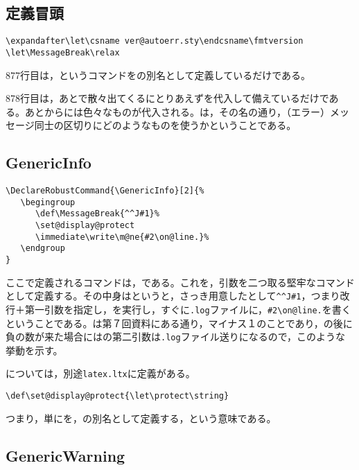 \documentclass[autodetect-engine,dvipdfmx]{jsarticle}
\begin{document}
\subsection{定義冒頭}

\latexltx
\begin{lstlisting}[firstnumber=877]
\expandafter\let\csname ver@autoerr.sty\endcsname\fmtversion
\let\MessageBreak\relax
\end{lstlisting}

877行目は，というコマンドをの別名として定義しているだけである。

878行目は，あとで散々出てくるにとりあえずを代入して備えているだけである。あとからには色々なものが代入される。は，その名の通り，（エラー）メッセージ同士の区切りにどのようなものを使うかということである。

\subsection{GenericInfo}

\latexltx
\begin{lstlisting}[firstnumber=879]
\DeclareRobustCommand{\GenericInfo}[2]{%
   \begingroup
      \def\MessageBreak{^^J#1}%
      \set@display@protect
      \immediate\write\m@ne{#2\on@line.}%
   \endgroup
}
\end{lstlisting}

ここで定義されるコマンドは，である。これを，引数を二つ取る堅牢なコマンドとして定義する。その中身はというと，さっき用意したとして\preSub\verb|^^J#1|\preSub，つまり改行＋第一引数を指定し，を実行し，すぐに\texttt{.log}ファイルに，\preSub\verb|#2\on@line.|\preSub を書くということである。は第７回資料にある通り，マイナス１のことであり，の後に負の数が来た場合にはの第二引数は\texttt{.log}ファイル送りになるので，このような挙動を示す。

については，別途\texttt{latex.ltx}に定義がある。

\latexltx
\begin{lstlisting}[firstnumber=763]
\def\set@display@protect{\let\protect\string}
\end{lstlisting}

つまり，単にを，の別名として定義する，という意味である。

\subsection{GenericWarning}
\end{document}
